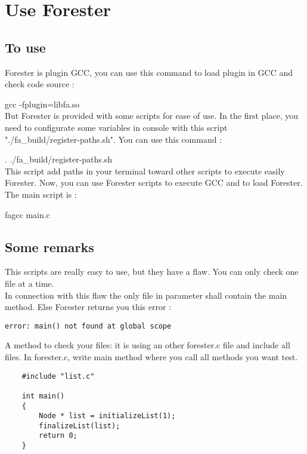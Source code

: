 \section {Use Forester}

	\subsection{To use}

Forester is plugin GCC, you can use this command to load plugin in GCC and check code source :

gcc -fplugin=libfa.so
\\

But Forester is provided with some scripts for ease of use. In the first place, you need to configurate some variables in console with this script "./fa\_build/register-paths.sh". You can use this command :

. ./fa\_build/register-paths.sh
\\

This script add paths in your terminal toward other scripts to execute easily Forester. Now, you can use Forester scripts to execute GCC and to load Forester. The main script is :

fagcc main.c
\\

	\subsection{Some remarks}
	
This scripts are really easy to use, but they have a flaw. You can only check one file at a time.
\\
In connection with this flaw the only file in parameter shall contain the main method. Else Forester returns you this error :

\lstset{language=C, numbers=left, frame=shadowbox}
\begin{lstlisting}
error: main() not found at global scope
\end{lstlisting}
\bigskip

A method to check your files: it is using an other forester.c file and include all files. In forester.c, write main method where you call all methods you want test.

\lstset{language=C, numbers=left, frame=shadowbox}
\begin{lstlisting}
	#include "list.c"

	int main()
	{
		Node * list = initializeList(1);
		finalizeList(list);
		return 0;
	}
\end{lstlisting}
\bigskip